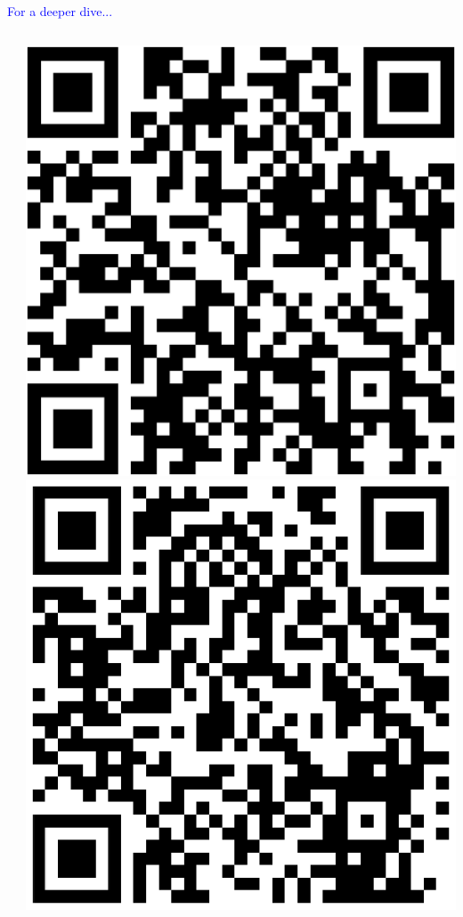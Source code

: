 \documentclass[lecture]{beamer}
\begin{document}
\begin{frame}{\normalsize}{}

\textcolor{blue}{\huge For a deeper dive...}

\begin{columns}
\vspace{-.9cm}\\
\footnotesize
\center

\includegraphics[width=1\textwidth,clip]{RG.eps}
\includegraphics[width=1\textwidth,clip]{GoogleScholar.eps}

\end{columns}
\end{frame}
\end{document}

